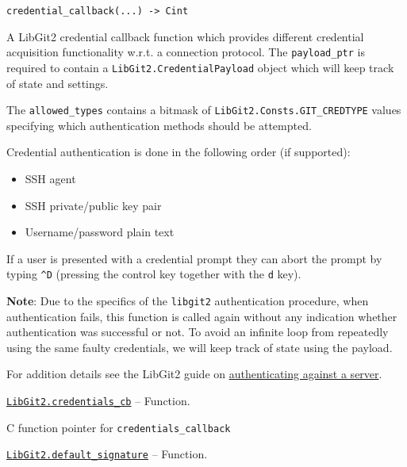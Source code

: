 \begin{adjustwidth}{2em}{0pt}


\begin{verbatim}
credential_callback(...) -> Cint
\end{verbatim}

A LibGit2 credential callback function which provides different credential acquisition functionality w.r.t. a connection protocol. The \texttt{payload\_ptr} is required to contain a \texttt{LibGit2.CredentialPayload} object which will keep track of state and settings.

The \texttt{allowed\_types} contains a bitmask of \texttt{LibGit2.Consts.GIT\_CREDTYPE} values specifying which authentication methods should be attempted.

Credential authentication is done in the following order (if supported):

\begin{itemize}
\item SSH agent


\item SSH private/public key pair


\item Username/password plain text

\end{itemize}
If a user is presented with a credential prompt they can abort the prompt by typing \texttt{{\textasciicircum}D} (pressing the control key together with the \texttt{d} key).

\textbf{Note}: Due to the specifics of the \texttt{libgit2} authentication procedure, when authentication fails, this function is called again without any indication whether authentication was successful or not. To avoid an infinite loop from repeatedly using the same faulty credentials, we will keep track of state using the payload.

For addition details see the LibGit2 guide on \href{https://libgit2.org/docs/guides/authentication/}{authenticating against a server}.



\end{adjustwidth}
\hypertarget{9226239310211022593}{}
\hyperlink{9226239310211022593}{\texttt{LibGit2.credentials\_cb}}  -- {Function.}

\begin{adjustwidth}{2em}{0pt}

C function pointer for \texttt{credentials\_callback}



\end{adjustwidth}
\hypertarget{4585945206005903475}{}
\hyperlink{4585945206005903475}{\texttt{LibGit2.default\_signature}}  -- {Function.}

